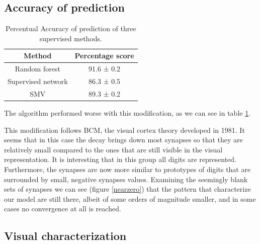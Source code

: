 \documentclass[a4paper]{report}
\begin{document}
\subsection{Accuracy of prediction}

\begin{table}[h!]
  \begin{center}
    \begin{tabular}{c|c} %
      \textbf{Method} & \textbf{Percentage score}\\
      \hline
      Random forest & 91.6  ± 0.2\\
      Supervised network & 86.3 ± 0.5\\
      SMV & 89.3 ± 0.2\\
    \end{tabular}
  \end{center}
  \caption{Percentual Accuracy of prediction of three supervised methods.}
  \label{decayT}
\end{table}

The algorithm performed worse with this modification, as we can see in table \ref{decayT}.

This modification follows BCM, the visual cortex theory developed in 1981.
It seems that in this case the decay brings down most synapses so that they are relatively small compared to the ones that are still visible in the visual representation.
It is interesting that in this group all digits are represented.
Furthermore, the synapses are now more similar to prototypes of digits that are surrounded by small, negative synapses values.
Examining the seemingly blank sets of synapses we can see (figure \ref{nearzero}) that the pattern that characterize our model are still there, albeit of some orders of magnitude smaller, and in some cases no convergence at all is reached.

\subsection{Visual characterization}
\end{document}
